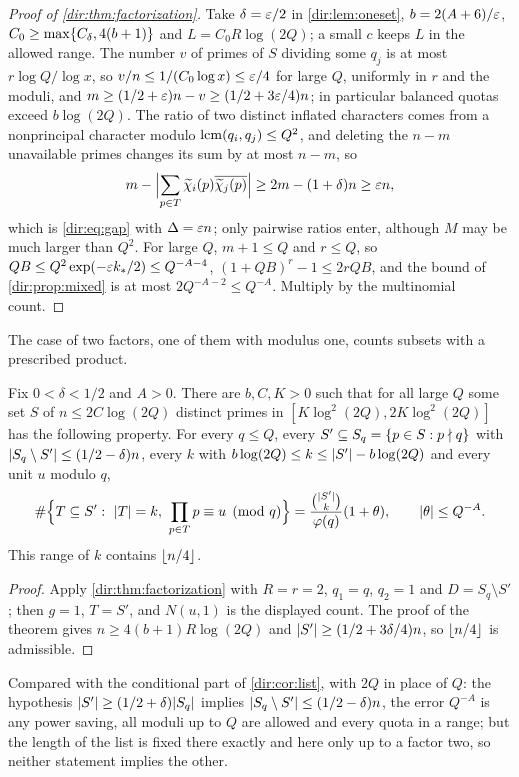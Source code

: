 \begin{proof}[Proof of \cref{dir:thm:factorization}]
Take $\delta=\varepsilon/2$ in \cref{dir:lem:oneset}, $b=2(A+6)/\varepsilon$,
$C_0\ge\max\{C_\delta,4(b+1)\}$ and $L=C_0R\log(2Q)$; a small $c$ keeps $L$ in the allowed
range. The number $v$ of primes of $S$ dividing some $q_j$ is at most $r\log Q/\log x$, so
$v/n\le1/(C_0\log x)\le\varepsilon/4$ for large $Q$, uniformly in $r$ and the moduli, and
$m\ge(1/2+\varepsilon)n-v\ge(1/2+3\varepsilon/4)n$; in particular balanced quotas exceed $b\log(2Q)$. The ratio
of two distinct inflated characters comes from a nonprincipal character modulo
$\operatorname{lcm}(q_i,q_j)\le Q^2$, and deleting the $n-m$ unavailable primes changes its sum by at most
$n-m$, so
\[
 m-\Bigl|\sum_{p\in T}\widetilde\chi_i(p)\overline{\widetilde\chi_j(p)}\Bigr|\ge2m-(1+\delta)n\ge\varepsilon n ,
\]
which is \eqref{dir:eq:gap} with $\Delta=\varepsilon n$; only pairwise ratios enter, although $M$ may be
much larger than $Q^2$. For large $Q$, $m+1\le Q$ and $r\le Q$, so
$QB\le Q^2\exp(-\varepsilon k_*/2)\le Q^{-A-4}$, $(1+QB)^r-1\le2rQB$, and the bound of
\cref{dir:prop:mixed} is at most $2Q^{-A-2}\le Q^{-A}$. Multiply by the multinomial count.
\end{proof}

The case of two factors, one of them with modulus one, counts subsets with a prescribed product.

\begin{corollary}\label{dir:cor:onelist}
Fix $0<\delta<1/2$ and $A>0$. There are $b,C,K>0$ such that for all large $Q$ some set $S$ of
$n\le2C\log(2Q)$ distinct primes in $[K\log^2(2Q),2K\log^2(2Q)]$ has the following property. For
every $q\le Q$, every $S'\subseteq S_q=\{p\in S:p\nmid q\}$ with
$\lvert S_q\setminus S'\rvert\le(1/2-\delta)n$, every $k$ with $b\log(2Q)\le k\le\lvert S'\rvert-b\log(2Q)$ and
every unit $u$ modulo $q$,
\[
 \#\Bigl\{T\subseteq S':\ \abs T=k,\ \prod_{p\in T}p\equiv u\pmod q\Bigr\}
 =\frac{\binom{\abs{S'}}k}{\varphi(q)}(1+\theta),\qquad\abs\theta\le Q^{-A}.
\]
This range of $k$ contains $\lfloor n/4\rfloor$.
\end{corollary}

\begin{proof}
Apply \cref{dir:thm:factorization} with $R=r=2$, $q_1=q$, $q_2=1$ and $D=S_q\setminus S'$; then
$g=1$, $T=S'$, and $N(u,1)$ is the displayed count. The proof of the theorem gives
$n\ge4(b+1)R\log(2Q)$ and $\lvert S'\rvert\ge(1/2+3\delta/4)n$, so $\lfloor n/4\rfloor$ is admissible.
\end{proof}

Compared with the conditional part of \cref{dir:cor:list}, with $2Q$ in place of $Q$: the
hypothesis $\lvert S'\rvert\ge(1/2+\delta)\lvert S_q\rvert$ implies $\lvert S_q\setminus S'\rvert\le(1/2-\delta)n$, the
error $Q^{-A}$ is any power saving, all moduli up to $Q$ are allowed and every quota in a range;
but the length of the list is fixed there exactly and here only up to a factor two, so neither
statement implies the other.

